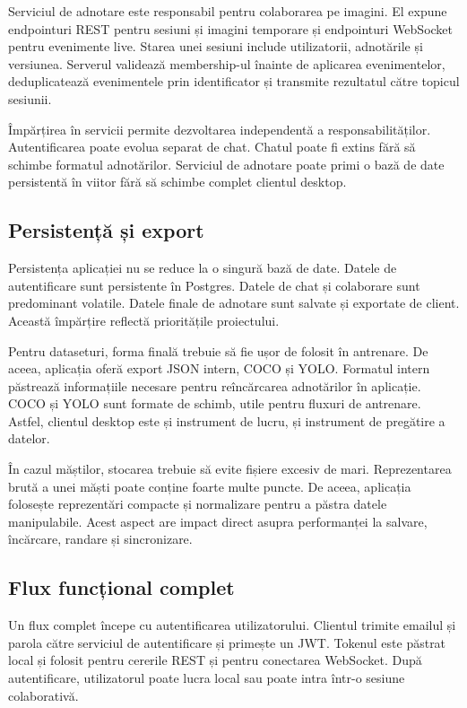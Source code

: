 Serviciul de adnotare este responsabil pentru colaborarea pe imagini.
El expune endpointuri REST pentru sesiuni și imagini temporare și endpointuri WebSocket pentru evenimente live.
Starea unei sesiuni include utilizatorii, adnotările și versiunea.
Serverul validează membership-ul înainte de aplicarea evenimentelor, deduplicatează evenimentele prin identificator și transmite rezultatul către topicul sesiunii.

Împărțirea în servicii permite dezvoltarea independentă a responsabilităților.
Autentificarea poate evolua separat de chat.
Chatul poate fi extins fără să schimbe formatul adnotărilor.
Serviciul de adnotare poate primi o bază de date persistentă în viitor fără să schimbe complet clientul desktop.

\subsection{Persistență și export}
\label{subsec:persistenta-export}

Persistența aplicației nu se reduce la o singură bază de date.
Datele de autentificare sunt persistente în Postgres.
Datele de chat și colaborare sunt predominant volatile.
Datele finale de adnotare sunt salvate și exportate de client.
Această împărțire reflectă prioritățile proiectului.

Pentru dataseturi, forma finală trebuie să fie ușor de folosit în antrenare.
De aceea, aplicația oferă export JSON intern, COCO și YOLO.
Formatul intern păstrează informațiile necesare pentru reîncărcarea adnotărilor în aplicație.
COCO și YOLO sunt formate de schimb, utile pentru fluxuri de antrenare.
Astfel, clientul desktop este și instrument de lucru, și instrument de pregătire a datelor.

În cazul măștilor, stocarea trebuie să evite fișiere excesiv de mari.
Reprezentarea brută a unei măști poate conține foarte multe puncte.
De aceea, aplicația folosește reprezentări compacte și normalizare pentru a păstra datele manipulabile.
Acest aspect are impact direct asupra performanței la salvare, încărcare, randare și sincronizare.

\subsection{Flux funcțional complet}
\label{subsec:flux-functional-complet}

Un flux complet începe cu autentificarea utilizatorului.
Clientul trimite emailul și parola către serviciul de autentificare și primește un JWT.
Tokenul este păstrat local și folosit pentru cererile REST și pentru conectarea WebSocket.
După autentificare, utilizatorul poate lucra local sau poate intra într-o sesiune colaborativă.

